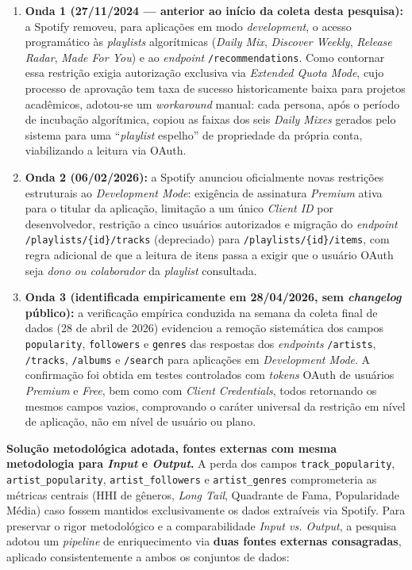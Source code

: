 \documentclass[12pt, %
openright,
oneside, %
a4paper,    %
english,   %
brazil]{facom-ufu-abntex2}
\begin{document}
\begin{enumerate}
  \item \textbf{Onda 1 (27/11/2024 --- anterior ao início da coleta desta
  pesquisa):} a Spotify removeu, para aplicações em modo
  \emph{development}, o acesso programático às \emph{playlists} algorítmicas
  (\emph{Daily Mix}, \emph{Discover Weekly}, \emph{Release Radar}, \emph{Made For
  You}) e ao \emph{endpoint} \texttt{/recommendations}. Como contornar essa
  restrição exigia autorização exclusiva via \emph{Extended Quota Mode}, 
  cujo processo de aprovação tem taxa de sucesso historicamente baixa para
  projetos acadêmicos, adotou-se um \emph{workaround} manual: cada persona,
  após o período de incubação algorítmica, copiou as faixas dos seis \emph{Daily
  Mixes} gerados pelo sistema para uma ``\emph{playlist} espelho'' de propriedade
  da própria conta, viabilizando a leitura via OAuth.

  \item \textbf{Onda 2 (06/02/2026):} a Spotify anunciou oficialmente novas
  restrições estruturais ao \emph{Development Mode}: exigência de assinatura
  \emph{Premium} ativa para o titular da aplicação, limitação a um único
  \emph{Client ID} por desenvolvedor, restrição a cinco usuários autorizados e
  migração do \emph{endpoint} \texttt{/playlists/\{id\}/tracks} (depreciado) para
  \texttt{/playlists/\{id\}/items}, com regra adicional de que a leitura de itens
  passa a exigir que o usuário OAuth seja \emph{dono ou colaborador} da
  \emph{playlist} consultada.

  \item \textbf{Onda 3 (identificada empiricamente em 28/04/2026, sem
  \emph{changelog} público):}
  a verificação empírica conduzida na semana da coleta final de dados (28 de
  abril de 2026) evidenciou a remoção
  sistemática dos campos \texttt{popularity}, \texttt{followers} e
  \texttt{genres} das respostas dos \emph{endpoints} \texttt{/artists},
  \texttt{/tracks}, \texttt{/albums} e \texttt{/search} para aplicações em
  \emph{Development Mode}. A confirmação foi obtida em testes controlados com
  \emph{tokens} OAuth de usuários \emph{Premium} e \emph{Free}, bem como com
  \emph{Client Credentials}, todos retornando os mesmos campos vazios, 
  comprovando o caráter universal da restrição em nível de aplicação, não em
  nível de usuário ou plano.
\end{enumerate}

\textbf{Solução metodológica adotada, fontes externas com mesma metodologia
para \emph{Input} e \emph{Output}.} A perda dos campos
\texttt{track\_popularity}, \texttt{artist\_popularity},
\texttt{artist\_followers} e \texttt{artist\_genres} comprometeria as métricas
centrais (HHI de gêneros, \emph{Long Tail}, Quadrante de Fama, Popularidade
Média) caso fossem mantidos exclusivamente os dados extraíveis via Spotify. Para
preservar o rigor metodológico e a comparabilidade \emph{Input vs. Output}, a
pesquisa adotou um \emph{pipeline} de enriquecimento via \textbf{duas fontes
externas consagradas}, aplicado consistentemente a ambos os conjuntos de dados:
\end{document}
